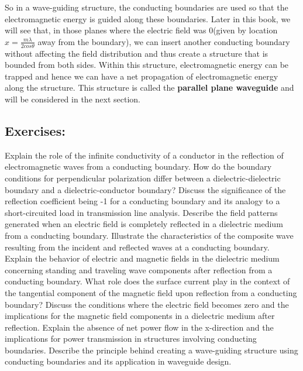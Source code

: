 So in a wave-guiding structure, the conducting boundaries are used so that the electromagnetic energy is guided along these boundaries. Later in this book, we will see that, in those planes where the electric field was $0$(given by location $x = \frac{m\lambda}{2cos\theta}$ away from the boundary), we can insert another conducting boundary without affecting the field distribution and thus create a structure that is bounded from both sides. Within this structure, electromagnetic energy can be trapped and hence we can have a net propagation of electromagnetic energy along the structure. This structure is called the \textbf{parallel plane waveguide}  and will be considered in the next section.

\begin{mdframed}[ backgroundcolor=lightblue, linewidth=1pt, hidealllines=true]
\section{Exercises:}
\begin{ExerciseList}
    \Exercise[label={ex11}]
    Explain the role of the infinite conductivity of a conductor in the reflection of electromagnetic waves from a conducting boundary.
    \Exercise[label={ex11}]
    How do the boundary conditions for perpendicular polarization differ between a dielectric-dielectric boundary and a dielectric-conductor boundary?
    \Exercise[label={ex11}]
    Discuss the significance of the reflection coefficient being -1 for a conducting boundary and its analogy to a short-circuited load in transmission line analysis.
    \Exercise[label={ex11}]
    Describe the field patterns generated when an electric field is completely reflected in a dielectric medium from a conducting boundary.
    \Exercise[label={ex11}]
    Illustrate the characteristics of the composite wave resulting from the incident and reflected waves at a conducting boundary.
    \Exercise[label={ex11}]
    Explain the behavior of electric and magnetic fields in the dielectric medium concerning standing and traveling wave components after reflection from a conducting boundary.
    \Exercise[label={ex11}]
    What role does the surface current play in the context of the tangential component of the magnetic field upon reflection from a conducting boundary?
    \Exercise[label={ex11}]
    Discuss the conditions where the electric field becomes zero and the implications for the magnetic field components in a dielectric medium after reflection.
    \Exercise[label={ex11}]
    Explain the absence of net power flow in the x-direction and the implications for power transmission in structures involving conducting boundaries.
    \Exercise[label={ex11}]
    Describe the principle behind creating a wave-guiding structure using conducting boundaries and its application in waveguide design.
\end{ExerciseList}
\end{mdframed}